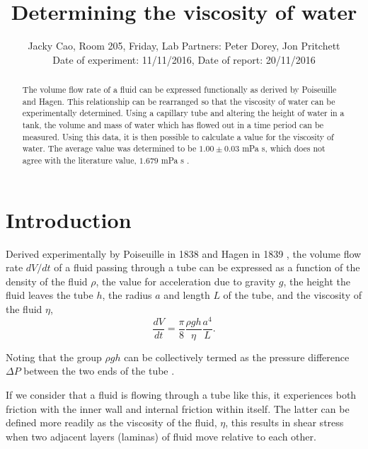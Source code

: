 \documentclass[twocolumn]{revtex4}
\newcommand{\squeezeup}{\vspace{-2.5mm}}
\begin{document}
\textheight=26.385cm

\title{Determining the viscosity of water} 
 
 
\author{Jacky Cao, Room 205, Friday, Lab Partners: Peter Dorey, Jon Pritchett \\ Date of experiment: 11/11/2016, Date of report: 20/11/2016}


\begin{abstract}              
The volume flow rate of a fluid can be expressed functionally as derived by Poiseuille and Hagen. This relationship can be rearranged so that the viscosity of water can be experimentally determined. Using a capillary tube and altering the height of water in a tank, the volume and mass of water which has flowed out in a time period can be measured. Using this data, it is then possible to calculate a value for the viscosity of water. The average value was determined to be $1.00 \pm 0.03$ mPa s, which does not agree with the literature value, $1.679$ mPa s \cite{crc}. 
\squeezeup
\squeezeup
\squeezeup
\end{abstract}

\maketitle

\squeezeup
\squeezeup

\section{Introduction} 
\vspace{-2ex} 
Derived experimentally by Poiseuille in 1838 and Hagen in 1839 \cite{poiseuillehagen}, the volume flow rate $dV/dt$ of a fluid passing through a tube can be expressed as a function of the density of the fluid $\rho$, the value for acceleration due to gravity $g$, the height the fluid leaves the tube $h$, the radius $a$ and length $L$ of the tube, and the viscosity of the fluid $\eta$,
\squeezeup
\begin{equation} 
\frac{dV}{dt}=\frac{\pi}{8}\frac{\rho gh}{\eta}\frac{a^4}{L}. 
\label{pohagen}
\end{equation}

Noting that the group $\rho gh$ can be collectively termed as the pressure difference $\Delta P$ between the two ends of the tube \cite{collegephysics}. 

If we consider that a fluid is flowing through a tube like this, it experiences both friction with the inner wall and internal friction within itself. The latter can be defined more readily as the viscosity of the fluid, $\eta$, this results in shear stress when two adjacent layers (laminas) of fluid move relative to each other. 
\end{document}
